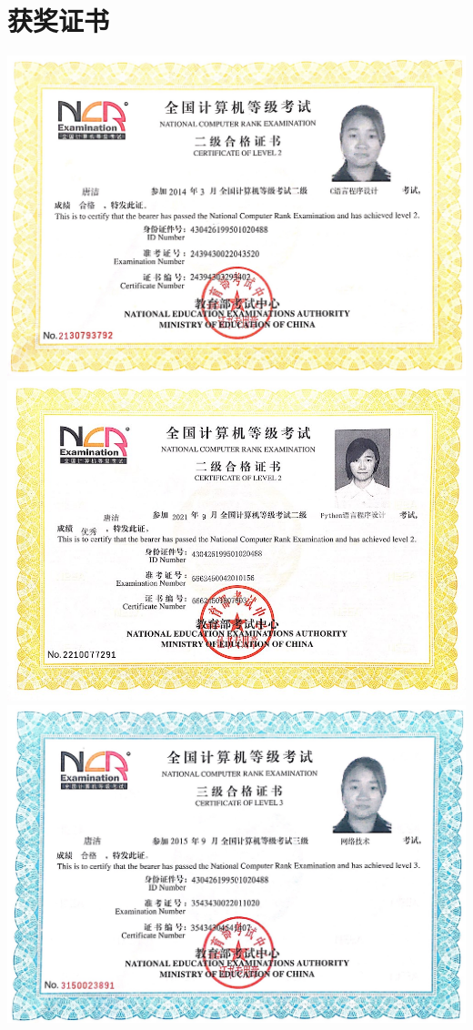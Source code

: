 \documentclass[UFT8]{ctexart}%
\begin{document}
\section{获奖证书}
\begin{center}
\includegraphics[scale=0.22]{figs/计算机二级C.jpg }
\includegraphics[scale=0.4]{figs/计算机二级Python.jpg }
\includegraphics[scale=0.21]{figs/计算机三级证书.jpg }

\end{center}
\end{document}
